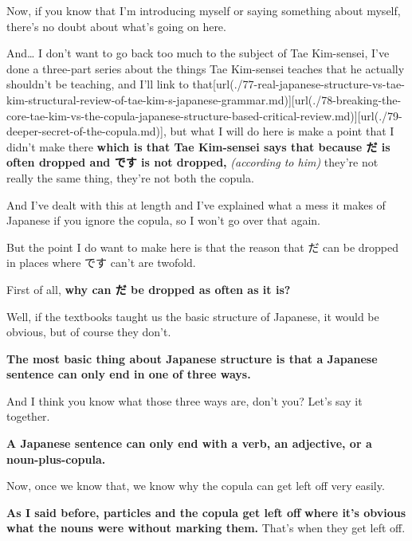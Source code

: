 {}

Now, if you know that I'm introducing myself or saying something about myself, there's no doubt about what's going on here.

And\ldots{} I don't want to go back too much to the subject of Tae Kim-sensei, I've done a three-part series about the things Tae Kim-sensei teaches that he actually shouldn't be teaching, and I'll link to that\goto{{[}77{]}}[url(./77-real-japanese-structure-vs-tae-kim-structural-review-of-tae-kim-s-japanese-grammar.md)]\goto{{[}78{]}}[url(./78-breaking-the-core-tae-kim-vs-the-copula-japanese-structure-based-critical-review.md)]\goto{{[}79{]}}[url(./79-deeper-secret-of-the-copula.md)], but what I will do here is make a point that I didn't make there {\bf which is that Tae Kim-sensei says that because だ is often dropped and です is not dropped,} {\em (according to him)} they're not really the same thing, they're not both the copula.

\stopsectionlevel

\startsectionlevel[title={Why だ is often dropped and です isn't},reference={why-だ-is-often-dropped-and-です-isnt}]

And I've dealt with this at length and I've explained what a mess it makes of Japanese if you ignore the copula, so I won't go over that again.

But the point I do want to make here is that the reason that だ can be dropped in places where です can't are twofold.

First of all, {\bf why can だ be dropped as often as it is?}

Well, if the textbooks taught us the basic structure of Japanese, it would be obvious, but of course they don't.

{\bf The most basic thing about Japanese structure is that a Japanese sentence can only end in one of three ways.}

And I think you know what those three ways are, don't you? Let's say it together.

{\bf A Japanese sentence can only end with a verb, an adjective, or a noun-plus-copula.}

{}

Now, once we know that, we know why the copula can get left off very easily.

{\bf As I said before, particles and the copula get left off} {\bf where it's obvious what the nouns were without marking them.} That's when they get left off.

